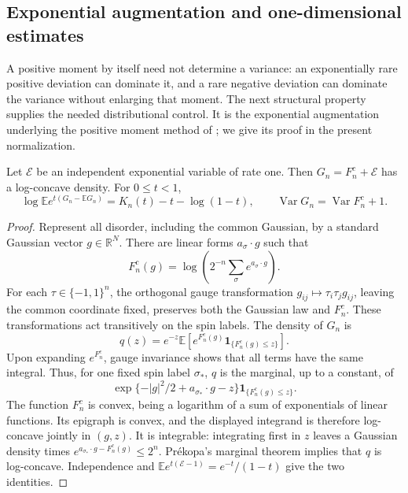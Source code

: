 \subsection{Exponential augmentation and one-dimensional estimates}

A positive moment by itself need not determine a variance: an
exponentially rare positive deviation can dominate it, and a rare
negative deviation can dominate the variance without enlarging that
moment.  The next structural property supplies the needed distributional
control.  It is the exponential augmentation underlying the positive
moment method of \cite[Proposition~5.1]{AL2026}; we give its proof in
the present normalization.

\begin{lemma}\label{fl:augmentation}
Let $\mathcal E$ be an independent exponential variable of rate one.
Then $G_n=F_n^c+\mathcal E$ has a log-concave density.  For $0\le t<1$,
\[
 \log\mathbb E e^{t(G_n-\mathbb EG_n)}
       =K_n(t)-t-\log(1-t),\qquad
 \operatorname{Var}G_n=\operatorname{Var}F_n^c+1.
\]
\end{lemma}

\begin{proof}
Represent all disorder, including the common Gaussian, by a standard
Gaussian vector $g\in\mathbb R^N$.  There are linear forms
$a_\sigma\cdot g$ such that
\[
 F_n^c(g)=\log\left(2^{-n}\sum_\sigma e^{a_\sigma\cdot g}\right).
\]
For each $\tau\in\{-1,1\}^n$, the orthogonal gauge transformation
$g_{ij}\mapsto\tau_i\tau_jg_{ij}$, leaving the common coordinate fixed,
preserves both the Gaussian law and $F_n^c$.  These transformations
act transitively on the spin labels.  The density of $G_n$ is
\[
 q(z)=e^{-z}\mathbb E\left[e^{F_n^c(g)}
                           \mathbf1_{\{F_n^c(g)\le z\}}\right].
\]
Upon expanding $e^{F_n^c}$, gauge invariance shows that all terms
have the same integral.  Thus, for one fixed spin label $\sigma_*$,
$q$ is the marginal, up to a constant, of
\[
 \exp\{-|g|^2/2+a_{\sigma_*}\cdot g-z\}
                      \mathbf1_{\{F_n^c(g)\le z\}}.
\]
The function $F_n^c$ is convex, being a logarithm of a sum of
exponentials of linear functions.  Its epigraph is convex, and the
displayed integrand is therefore log-concave jointly in $(g,z)$.
It is integrable: integrating first in $z$ leaves a Gaussian density
times $e^{a_{\sigma_*}\cdot g-F_n^c(g)}\le2^n$.
Pr\'ekopa's marginal theorem \cite[Theorems~6 and~8]{Prekopa1973}
implies that $q$ is log-concave. Independence and
$\mathbb E e^{t(\mathcal E-1)}=e^{-t}/(1-t)$ give the two identities.
\end{proof}


